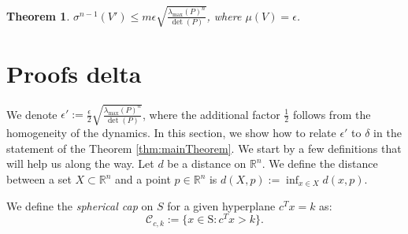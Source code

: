 \documentclass[letterpaper, 10 pt, conference]{ieeeconf}  %
\newcommand{\R}{\mathbb{R} }
\newcommand{\dist}{d}
\newcommand{\calC}{\mathcal{C}}
\newcommand{\sphere}{\text{S}}
\newtheorem{theorem}{Theorem}[section]
\newtheorem{proposition}[theorem]{Proposition}
\newenvironment{definition}[1][Definition]{\begin{trivlist}
\item[\hskip \labelsep {\bfseries #1}]}{\end{trivlist}}
\begin{document}
\begin{theorem}$\sigma^{n-1}(V') \leq m\epsilon \sqrt{\frac{\lambda_{\max}(P)^n}{\det(P)}}$,
where $\mu(V) = \epsilon$.
\end{theorem}


\section{Proofs delta}
We denote $\epsilon':=\frac{\epsilon}{2} \sqrt{\frac{\lambda_{\max}(P)^n}{\det(P)}}$, where the additional factor $\frac{1}{2}$ follows from the homogeneity of the dynamics. In this section, we show how to relate $\epsilon'$ to $\delta$ in the statement of the Theorem \ref{thm:mainTheorem}. We start by a few definitions that will help us along the way. Let $\dist$ be a distance on $\R^n$. We define the distance between a set $X \subset \R^n$ and a point $p \in \R^n$ is $\dist(X, p):=\inf_{x \in X}\dist(x,p)$.

\begin{definition}[Spherical Cap]We define the \emph{spherical cap} on $S$ for a given hyperplane $c^Tx = k$ as:
\begin{equation*}\calC_{c,k} := \{x \in \sphere : c^Tx >k\}.\end{equation*}
\end{definition}



\end{document}
